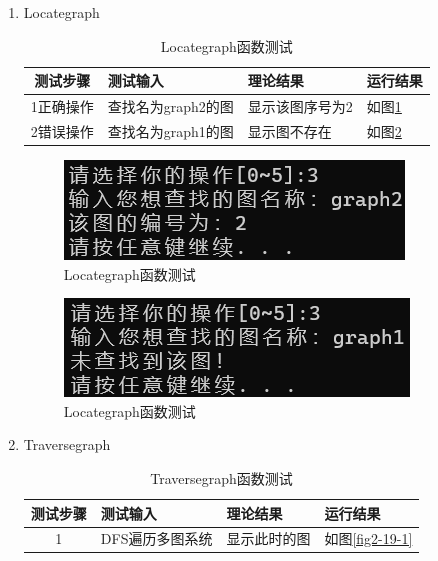 \documentclass[supercite]{Experimental_Report}
\theoremstyle{definition}
\begin{document}
\begin{enumerate}
	\item Locategraph
	\begin{table}[h!]
		\begin{center}
			\caption{Locategraph函数测试}
			\begin{tabular}{|c|p{4cm}<{\centering}|p{4cm}<{\centering}|p{4cm}<{\centering}|} 
				\hline
				\textbf{测试步骤} & \textbf{测试输入} & \textbf{理论结果} & \textbf{运行结果} \\
				\hline
				1正确操作 & 查找名为graph2的图 &显示该图序号为2 &如图\ref{fig2-18-1}\\
				\hline
				2错误操作 & 查找名为graph1的图 &显示图不存在 &如图\ref{fig2-18-2}\\
				\hline
			\end{tabular}
		\end{center}
	\end{table}
	\begin{figure}[H] %
		\begin{center}
			\includegraphics[width=0.5\linewidth]{images/graph/18-3-1.png}
			\caption{ Locategraph函数测试}
			\label{fig2-18-1}
		\end{center}
	\end{figure}
	\begin{figure}[H] %
		\begin{center}
			\includegraphics[width=0.5\linewidth]{images/graph/18-3-2.png}
			\caption{ Locategraph函数测试}
			\label{fig2-18-2}
		\end{center}
	\end{figure}
	\item Traversegraph
	\begin{table}[h!]
		\begin{center}
			\caption{Traversegraph函数测试}
			\begin{tabular}{|c|p{4cm}<{\centering}|p{4cm}<{\centering}|p{4cm}<{\centering}|} 
				\hline
				\textbf{测试步骤} & \textbf{测试输入} & \textbf{理论结果} & \textbf{运行结果} \\
				\hline
				1 & DFS遍历多图系统 &显示此时的图 &如图\ref{fig2-19-1}\\

\end{tabular}
\end{center}
\end{table}
\end{enumerate}
\end{document}
